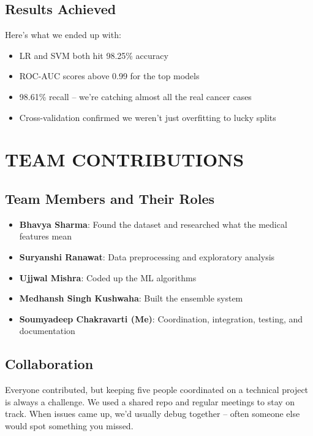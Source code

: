 \documentclass[12pt]{article}
\begin{document}
\subsection{Results Achieved}
Here's what we ended up with:
\begin{itemize}
    \item LR and SVM both hit 98.25\% accuracy
    \item ROC-AUC scores above 0.99 for the top models
    \item 98.61\% recall -- we're catching almost all the real cancer cases
    \item Cross-validation confirmed we weren't just overfitting to lucky splits
\end{itemize}

\newpage
\section{TEAM CONTRIBUTIONS}

\subsection{Team Members and Their Roles}

\begin{itemize}
    \item \textbf{Bhavya Sharma}: Found the dataset and researched what the medical features mean
    \item \textbf{Suryanshi Ranawat}: Data preprocessing and exploratory analysis
    \item \textbf{Ujjwal Mishra}: Coded up the ML algorithms
    \item \textbf{Medhansh Singh Kushwaha}: Built the ensemble system
    \item \textbf{Soumyadeep Chakravarti (Me)}: Coordination, integration, testing, and documentation
\end{itemize}

\subsection{Collaboration}
Everyone contributed, but keeping five people coordinated on a technical project is always a challenge. We used a shared repo and regular meetings to stay on track. When issues came up, we'd usually debug together -- often someone else would spot something you missed.

\newpage
\end{document}
